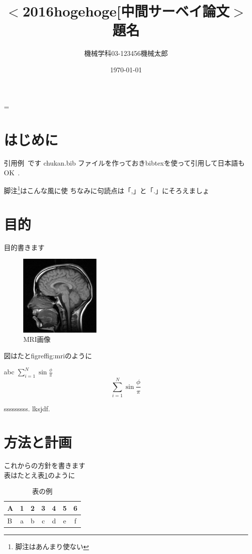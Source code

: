 \documentclass[a4j, twocolumn, 8pt,pdflatex,ja=standard]{bxjsarticle}
\title{{\small $<$2016hogehoge[中間サーベイ論文$>$}\\
       {\Large 題名}\vspace{-4mm}}
\author{{\normalsize 機械学科03-123456機械太郎}\vspace{-4mm}}
\date{\small \today}
\makeatletter
\renewcommand{\tablename}{表}
\def \tabref  #1{\tablename\ref{#1}}
\renewcommand\maketitle{
  \ifnum \col@number=\@ne \@maketitle
  \else \twocolumn[
    \vspace{-16mm}
    \@maketitle
  ]
  \fi
 }
\makeatother
\begin{document}
\maketitle \thispagestyle{empty}
\normalsize
\vspace{-8mm}


\section{はじめに}
\vspace{-3mm}

引用例~\cite{Brooks1991:Intelligence_Without_Reason}です
chukan.bib ファイルを作っておきbibtexを使って引用して日本語もOK~\cite{book:Pfeifer:知の創成}.

脚注\footnote{脚注はあんまり使ない}はこんな風に使
ちなみに句読点は「,」と「.」にそろえましょ

\section{目的}
\vspace{-3mm}
目的書きます
\begin{figure}[htbp]
 \begin{center}
 \includegraphics[height=4cm]{./figure/map.jpg}
 \caption{MRI画像}
 \label{fig:mri}
 \end{center}
\end{figure}

\vspace{-9mm}
図はたとfigref{fig:mri}のように

abc $ \sum_{i=1}^N \sin \frac{\phi}{\pi}$
\begin{equation}
 \sum_{i=1}^N \sin \frac{\phi}{\pi}
\end{equation}

sssssssss. lksjdf. 

\section{方法と計画}

これからの方針を書きます\\表はたとえ\tabref{table:table_example}のように
\begin{table}[htbp]
  \centering
  \caption{表の例}
  \label{table:table_example}
  \begin{tabular}{l|cccccc}
    \hline
    A & 1 & 2 & 3 & 4 & 5 & 6\\
    \hline
    B & a & b & c & d & e & f\\
    \hline
  \end{tabular}
\end{table}
\end{document}
